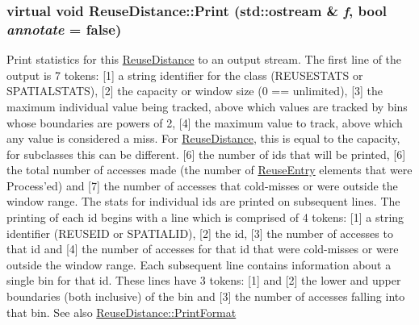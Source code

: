 \hypertarget{class_reuse_distance_ae693ec30500fcdd2222f0f07d207c0ce}{
\subsubsection[{Print}]{\setlength{\rightskip}{0pt plus 5cm}virtual void ReuseDistance::Print (std::ostream \& {\em f}, \/  bool {\em annotate} = {\ttfamily false})}}
\label{class_reuse_distance_ae693ec30500fcdd2222f0f07d207c0ce}
Print statistics for this \hyperlink{class_reuse_distance}{ReuseDistance} to an output stream. The first line of the output is 7 tokens: \mbox{[}1\mbox{]} a string identifier for the class (REUSESTATS or SPATIALSTATS), \mbox{[}2\mbox{]} the capacity or window size (0 == unlimited), \mbox{[}3\mbox{]} the maximum individual value being tracked, above which values are tracked by bins whose boundaries are powers of 2, \mbox{[}4\mbox{]} the maximum value to track, above which any value is considered a miss. For \hyperlink{class_reuse_distance}{ReuseDistance}, this is equal to the capacity, for subclasses this can be different. \mbox{[}6\mbox{]} the number of ids that will be printed, \mbox{[}6\mbox{]} the total number of accesses made (the number of \hyperlink{struct_reuse_entry}{ReuseEntry} elements that were Process'ed) and \mbox{[}7\mbox{]} the number of accesses that cold-\/misses or were outside the window range. The stats for individual ids are printed on subsequent lines. The printing of each id begins with a line which is comprised of 4 tokens: \mbox{[}1\mbox{]} a string identifier (REUSEID or SPATIALID), \mbox{[}2\mbox{]} the id, \mbox{[}3\mbox{]} the number of accesses to that id and \mbox{[}4\mbox{]} the number of accesses for that id that were cold-\/misses or were outside the window range. Each subsequent line contains information about a single bin for that id. These lines have 3 tokens: \mbox{[}1\mbox{]} and \mbox{[}2\mbox{]} the lower and upper boundaries (both inclusive) of the bin and \mbox{[}3\mbox{]} the number of accesses falling into that bin. See also \hyperlink{class_reuse_distance_a027a92a58a6639e8ed13a7490d11dcf5}{ReuseDistance::PrintFormat}


